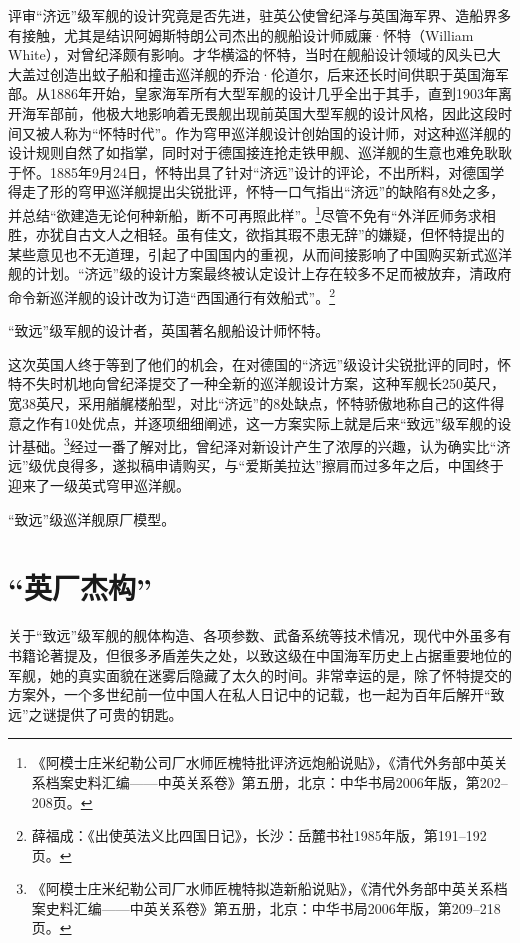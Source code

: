 \documentclass[12pt,UTF8]{ctexbook}
\begin{document}
评审“济远”级军舰的设计究竟是否先进，驻英公使曾纪泽与英国海军界、造船界多有接触，尤其是结识阿姆斯特朗公司杰出的舰船设计师威廉·怀特（William White），对曾纪泽颇有影响。才华横溢的怀特，当时在舰船设计领域的风头已大大盖过创造出蚊子船和撞击巡洋舰的乔治·伦道尔，后来还长时间供职于英国海军部。从1886年开始，皇家海军所有大型军舰的设计几乎全出于其手，直到1903年离开海军部前，他极大地影响着无畏舰出现前英国大型军舰的设计风格，因此这段时间又被人称为“怀特时代”。作为穹甲巡洋舰设计创始国的设计师，对这种巡洋舰的设计规则自然了如指掌，同时对于德国接连抢走铁甲舰、巡洋舰的生意也难免耿耿于怀。1885年9月24日，怀特出具了针对“济远”设计的评论，不出所料，对德国学得走了形的穹甲巡洋舰提出尖锐批评，怀特一口气指出“济远”的缺陷有8处之多，并总结“欲建造无论何种新船，断不可再照此样”。\footnote{《阿模士庄米纪勒公司厂水师匠槐特批评济远炮船说贴》，《清代外务部中英关系档案史料汇编——中英关系卷》第五册，北京：中华书局2006年版，第202--208页。}尽管不免有“外洋匠师务求相胜，亦犹自古文人之相轻。虽有佳文，欲指其瑕不患无辞”的嫌疑，但怀特提出的某些意见也不无道理，引起了中国国内的重视，从而间接影响了中国购买新式巡洋舰的计划。“济远”级的设计方案最终被认定设计上存在较多不足而被放弃，清政府命令新巡洋舰的设计改为订造“西国通行有效船式”。\footnote{薛福成：《出使英法义比四国日记》，长沙：岳麓书社1985年版，第191--192页。}

“致远”级军舰的设计者，英国著名舰船设计师怀特。

这次英国人终于等到了他们的机会，在对德国的“济远”级设计尖锐批评的同时，怀特不失时机地向曾纪泽提交了一种全新的巡洋舰设计方案，这种军舰长250英尺，宽38英尺，采用艏艉楼船型，对比“济远”的8处缺点，怀特骄傲地称自己的这件得意之作有10处优点，并逐项细细阐述，这一方案实际上就是后来“致远”级军舰的设计基础。\footnote{《阿模士庄米纪勒公司厂水师匠槐特拟造新船说贴》，《清代外务部中英关系档案史料汇编——中英关系卷》第五册，北京：中华书局2006年版，第209--218页。}经过一番了解对比，曾纪泽对新设计产生了浓厚的兴趣，认为确实比“济远”级优良得多，遂拟稿申请购买，与“爱斯美拉达”擦肩而过多年之后，中国终于迎来了一级英式穹甲巡洋舰。

“致远”级巡洋舰原厂模型。

\section{“英厂杰构”}

关于“致远”级军舰的舰体构造、各项参数、武备系统等技术情况，现代中外虽多有书籍论著提及，但很多矛盾差失之处，以致这级在中国海军历史上占据重要地位的军舰，她的真实面貌在迷雾后隐藏了太久的时间。非常幸运的是，除了怀特提交的方案外，一个多世纪前一位中国人在私人日记中的记载，也一起为百年后解开“致远”之谜提供了可贵的钥匙。
\end{document}
